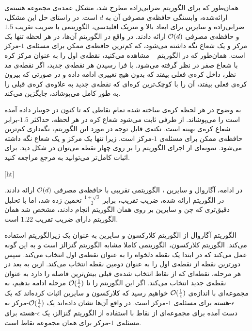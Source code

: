 همان‌طور که برای الگوریتم ضرابی‌زاده مطرح شد، مشکل عمده‌ی مجموعه هسته‌ی ارائه‌شده، وابستگی حافظه‌ی مصرفی آن به $d$ است.
در راستای حل این مشکل، ضرابی‌زاده و سایرین  برای ابعاد بالا و متریک اقلیدسی، الگوریتمی با ضریب تقریب $1.5$ و حافظه‌ی مصرفی $\mathcal{O}(d)$ ارائه دادند.
در واقع در الگوریتم آن‌ها، در هر لحظه تنها یک مرکز و یک شعاع نگه داشته می‌شود، که کم‌ترین حافظه‌ی ممکن برای مسئله‌ی $1$-مرکز است.
همان‌طور که در الگوریتم ~ مشاهده می‌کنید، نقطه‌ی اول را به عنوان مرکز کره با شعاع صفر در نظر گرفته می‌شود.
با فرا رسیدن هر نقطه‌ی جدید، اگر نقطه‌ی مد نظر، داخل کره‌ی فعلی بیفتد که بدون هیچ تغییری ادامه داده و در صورتی که بیرون کره‌ی فعلی بیفتد، آن را با کوچک‌ترین کره‌ای که نقطه‌ی جدید به علاوه‌ی کره‌ی قبلی را به طور کامل می‌پوشاند، جایگزین می‌کند. 

به وضوح در هر لحظه کره‌ی ساخته شده تمام نقاطی که تا کنون در جویبار داده آمده است را می‌پوشاند.
از طرفی ثابت می‌شود شعاع کره در هر لحظه، حداکثر $1.5$-برابر شعاع کره‌ی بهینه است.
نکته‌ی قابل توجه در مورد این الگوریتم، نگه‌داری کم‌ترین حافظه‌ی ممکن برای مسئله‌ی $1$-مرکز است.
زیرا تنها یک مرکز و یک شعاع نگه داشته می‌شود.
نمونه‌ای از اجرای الگوریتم را بر روی چهار نقطه می‌توان در شکل  دید.
برای اثبات کامل‌تر می‌توانید به مرجع  مراجعه کنید. 

[ht]


در ادامه، آگاروال و سایرین ، الگوریتمی تقریبی با حافظه‌ی مصرفی $\mathcal{O}(d)$ ارائه دادند.
در الگوریتم ارائه شده، ضریب تقریب، برابر $\frac{1 + \sqrt{3}}{2}$  تخمین زده شد، اما با تحلیل دقیق‌تری که چن و سایرین  بر روی همان الگوریتم انجام دادند، مشخص شد همان الگوریتم دارای ضریب تقریب $1.22$ است.

الگوریتم آگاروال از الگوریتم کلارکسون و سایرین  به عنوان یک زیرالگوریتم استفاده می‌کند.
الگوریتم کلارکسون، الگوریتمی کاملا مشابه الگوریتم گنزالز است و به این گونه عمل می‌کند که در ابتدا یک نقطه دلخواه را به عنوان نقطه‌ی اول انتخاب می‌کند.
سپس دورترین نقطه از‌ نقطه‌ی اول را به عنوان دومین نقطه انتخاب می‌کند.
ازین به بعد در هر مرحله، نقطه‌ای که از نقاط انتخاب شده‌ی قبلی بیش‌ترین فاصله را دارد به عنوان نقطه‌ی جدید انتخاب می‌کند.
اگر این الگوریتم را تا $\mathcal{O}(\frac{1}{\epsilon})$ مرحله ادامه بدهیم، به مجموعه‌ای با اندازه‌ی $\mathcal{O}(\frac{1}{\epsilon})$ خواهیم رسید که کلارکسون و سایرین اثبات کرده‌اند که یک $\epsilon$-هسته برای مسئله‌ی $1$-مرکز‌ است.
در واقع آن‌ها نشان داده‌اند یک $\mathcal{O}(\frac{1}{\epsilon})$-مرکز به دست آمده برای مجموعه‌ای از نقاط با استفاده از الگوریتم گنزالز، یک $\epsilon$-هسته برای مسئله‌ی $1$-مرکز برای همان مجموعه نقاط است.


